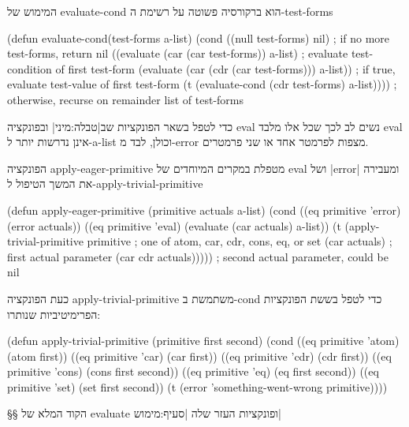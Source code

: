 המימוש של evaluate-cond הוא ברקורסיה פשוטה על רשימת ה-test-forms
\begin{KERNEL}
(defun evaluate-cond(test-forms a-list)
  (cond ((null test-forms) nil) ; if no more test-forms, return nil
        ((evaluate (car (car test-forms)) a-list) ; evaluate test-condition of first test-form
        (evaluate (car (cdr (car test-forms))) a-list)) ; if true, evaluate test-value of first test-form
        (t (evaluate-cond (cdr test-forms) a-list)))) ; otherwise, recurse on remainder list of test-forms
\end{KERNEL}

כדי לטפל בשאר הפונקציות שב|טבלה:מיני| ובפונקציה eval נשים לב לכך שכל אלו
מלבד eval אינן נדרשות יותר ל-a-list וכולן, לבד מ-error מצפות לפרמטר אחד או שני פרמטרים.

הפונקציה apply-eager-primitive מטפלת במקרים המיוחדים של eval ושל \E|error|
ומעבירה את המשך הטיפול ל-apply-trivial-primitive
\begin{KERNEL}
(defun apply-eager-primitive (primitive actuals a-list)
  (cond ((eq primitive 'error) (error actuals))
        ((eq primitive 'eval) (evaluate (car actuals) a-list))
        (t (apply-trivial-primitive
              primitive ; one of atom, car, cdr, cons, eq, or set
              (car actuals) ; first actual parameter
              (car cdr actuals))))) ; second actual parameter, could be nil
\end{KERNEL}

כעת הפונקציה apply-trivial-primitive משתמשת ב-cond כדי לטפל בששת הפונקציות הפרימיטיביות שנותרו:
\begin{KERNEL}
(defun apply-trivial-primitive (primitive first second)
  (cond ((eq primitive 'atom) (atom first))
        ((eq primitive 'car) (car first))
        ((eq primitive 'cdr) (cdr first))
        ((eq primitive 'cons) (cons first second))
        ((eq primitive 'eq) (eq first second))
        ((eq primitive 'set) (set first second))
        (t (error 'something-went-wrong primitive))))
\end{KERNEL}

§§ הקוד המלא של evaluate ופונקציות העזר שלה
|סעיף:מימוש|

\immediate\closeout {}

\begin{LTR}
  
\end{LTR}

